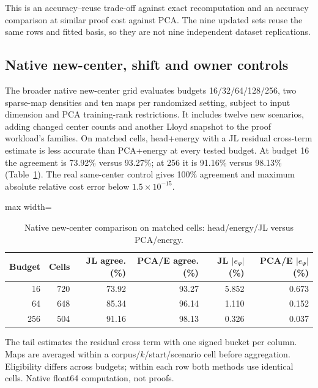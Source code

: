 \documentclass[5p,times,twocolumn]{elsarticle}
\theoremstyle{plain}
\theoremstyle{definition}
\theoremstyle{remark}
\begin{document}
\par\endgroup

\begingroup\color{RevisionGreen}
This is an accuracy--reuse trade-off against exact recomputation and an accuracy comparison at similar proof cost against PCA. The nine updated sets reuse the same rows and fitted basis, so they are not nine independent dataset replications.


\par\endgroup
\subsection{\textcolor{RevisionGreen}{Native new-center, shift and owner controls}}
\begingroup\color{RevisionGreen}
The broader native new-center grid evaluates budgets 16/32/64/128/256, two sparse-map densities and ten maps per randomized setting, subject to input dimension and PCA training-rank restrictions. It includes twelve new scenarios, adding changed center counts and another Lloyd snapshot to the proof workload's families. On matched cells, head+energy with a JL residual cross-term estimate is less accurate than PCA+energy at every tested budget. At budget 16 the agreement is 73.92\% versus 93.27\%; at 256 it is 91.16\% versus 98.13\% (Table~\ref{tab:reuse-jl}). The real same-center control gives 100\% agreement and maximum absolute relative cost error below $1.5\times10^{-15}$.


\par\endgroup
\begingroup\color{RevisionGreen}
\begin{table}[tp]\color{RevisionGreen}
\caption{Native new-center comparison on matched cells: head/energy/JL versus PCA/energy.}\label{tab:reuse-jl}
\centering\small
\begin{adjustbox}{max width=\textwidth}
\begin{tabular}{@{}rrrrrr@{}}
\toprule
Budget & Cells & JL agree. (\%) & PCA/E agree. (\%) & JL $|e_\Psi|$ (\%) & PCA/E $|e_\Psi|$ (\%) \\
\midrule
16 & 720 & 73.92 & 93.27 & 5.852 & 0.673 \\
64 & 648 & 85.34 & 96.14 & 1.110 & 0.152 \\
256 & 504 & 91.16 & 98.13 & 0.326 & 0.037 \\
\bottomrule
\end{tabular}
\end{adjustbox}
\par\smallskip\begin{minipage}{0.98\textwidth}\footnotesize The tail estimates the residual cross term with one signed bucket per column. Maps are averaged within a corpus/$k$/start/scenario cell before aggregation. Eligibility differs across budgets; within each row both methods use identical cells. Native float64 computation, not proofs.\end{minipage}
\end{table}
\end{document}
